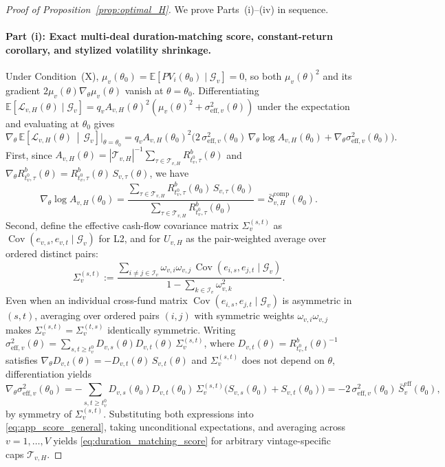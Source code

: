 \begin{proof}[Proof of Proposition~\ref{prop:optimal_H}]
We prove Parts~(i)--(iv) in sequence.

\paragraph{Part (i): Exact multi-deal duration-matching score, constant-return corollary, and stylized volatility shrinkage.}
Under Condition~(X), $\mu_v(\theta_0) = \mathbb{E}[PV_i(\theta_0) \mid \mathcal{G}_v] = 0$, so both $\mu_v(\theta)^2$ and its gradient $2\mu_v(\theta)\nabla_\theta\mu_v(\theta)$ vanish at $\theta = \theta_0$.
Differentiating $\mathbb{E}[\mathcal{L}_{v,H}(\theta) \mid \mathcal{G}_v] = q_v A_{v,H}(\theta)^2(\mu_v(\theta)^2 + \sigma_{\mathrm{eff},v}^2(\theta))$ under the expectation and evaluating at $\theta_0$ gives
\begin{equation}
\label{eq:app_score_general}
\nabla_\theta\,\mathbb{E}\!\left[\mathcal{L}_{v,H}(\theta) \,\middle|\, \mathcal{G}_v\right]\Big|_{\theta=\theta_0}
= q_v A_{v,H}(\theta_0)^2\Big(2\,\sigma_{\mathrm{eff},v}^2(\theta_0)\,\nabla_\theta\log A_{v,H}(\theta_0) + \nabla_\theta\sigma_{\mathrm{eff},v}^2(\theta_0)\Big).
\end{equation}
First, since $A_{v,H}(\theta) = |\mathcal{T}_{v,H}|^{-1}\sum_{\tau\in\mathcal{T}_{v,H}} R^b_{t_v^0,\tau}(\theta)$ and $\nabla_\theta R^b_{t_v^0,\tau}(\theta) = R^b_{t_v^0,\tau}(\theta)\,S_{v,\tau}(\theta)$, we have
\[
\nabla_\theta\log A_{v,H}(\theta_0)
= \frac{\sum_{\tau\in\mathcal{T}_{v,H}} R^b_{t_v^0,\tau}(\theta_0)\,S_{v,\tau}(\theta_0)}{\sum_{\tau\in\mathcal{T}_{v,H}} R^b_{t_v^0,\tau}(\theta_0)}
= \bar{S}_{v,H}^{\mathrm{comp}}(\theta_0).
\]
Second, define the effective cash-flow covariance matrix $\Sigma_v^{(s,t)}$ as $\operatorname{Cov}(e_{v,s}, e_{v,t} \mid \mathcal{G}_v)$ for L2, and for $U_{v,H}$ as the pair-weighted average over ordered distinct pairs:
\[
\Sigma_v^{(s,t)} := \frac{\sum_{i \neq j \in \mathcal{I}_v} \omega_{v,i}\omega_{v,j}\,\operatorname{Cov}(e_{i,s}, e_{j,t} \mid \mathcal{G}_v)}{1 - \sum_{k \in \mathcal{I}_v}\omega_{v,k}^2}.
\]
Even when an individual cross-fund matrix $\operatorname{Cov}(e_{i,s}, e_{j,t} \mid \mathcal{G}_v)$ is asymmetric in $(s,t)$, averaging over ordered pairs $(i,j)$ with symmetric weights $\omega_{v,i}\omega_{v,j}$ makes $\Sigma_v^{(s,t)} = \Sigma_v^{(t,s)}$ identically symmetric. Writing $\sigma_{\mathrm{eff},v}^2(\theta) = \sum_{s,t \ge t_v^0} D_{v,s}(\theta) D_{v,t}(\theta)\,\Sigma_v^{(s,t)}$, where $D_{v,t}(\theta) = R^b_{t_v^0,t}(\theta)^{-1}$ satisfies $\nabla_\theta D_{v,t}(\theta) = -D_{v,t}(\theta)\,S_{v,t}(\theta)$ and $\Sigma_v^{(s,t)}$ does not depend on $\theta$, differentiation yields
\[
\nabla_\theta\sigma_{\mathrm{eff},v}^2(\theta_0)
= -\sum_{s,t\ge t_v^0} D_{v,s}(\theta_0)D_{v,t}(\theta_0)\,\Sigma_v^{(s,t)}\bigl(S_{v,s}(\theta_0) + S_{v,t}(\theta_0)\bigr)
= -2\,\sigma_{\mathrm{eff},v}^2(\theta_0)\,\bar{S}_v^{\mathrm{eff}}(\theta_0),
\]
by symmetry of $\Sigma_v^{(s,t)}$. Substituting both expressions into \eqref{eq:app_score_general}, taking unconditional expectations, and averaging across $v = 1,\dots,V$ yields \eqref{eq:duration_matching_score} for arbitrary vintage-specific caps $\mathcal{T}_{v,H}$.


\end{proof}
